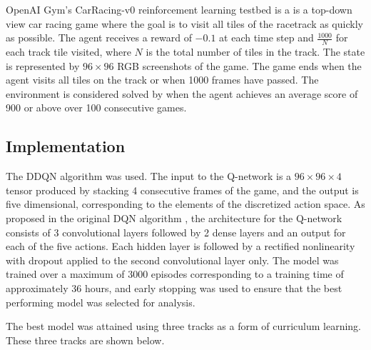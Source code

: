 \documentclass{article}
\begin{document}
OpenAI Gym’s CarRacing-v0 reinforcement learning testbed
\cite{CarRacing} is a is a top-down view car racing game where the
goal is to visit all tiles of the racetrack as quickly as
possible. The agent receives a reward of $-0.1$ at each time step and
$\frac{1000}{N}$ for each track tile visited, where $N$ is the total
number of tiles in the track. The state is represented by $96\times96$
RGB screenshots of the game. The game ends when the agent visits all
tiles on the track or when 1000 frames have passed. The environment is
considered solved by when the agent achieves an average score of 900
or above over 100 consecutive games. 


\subsection{Implementation}
The DDQN algorithm \cite{DDQN} was used. The input
to the Q-network is a $96\times96\times4$ tensor produced by stacking
4 consecutive frames of the game, and the output is five dimensional,
corresponding to the elements of the discretized action space. As
proposed in the original DQN algorithm \cite{DQN}, the architecture
for the Q-network consists of 3 convolutional layers followed by 2
dense layers and an output for each of the five actions. Each hidden
layer is followed by a rectified nonlinearity with dropout applied to
the second convolutional layer only. The model was trained over a
maximum of 3000 episodes corresponding to a training time of
approximately 36 hours, and early stopping was used to ensure that the
best performing model was selected for analysis.  

The best model was attained using three tracks as a form of curriculum
learning. These three tracks are shown below. 
\end{document}
